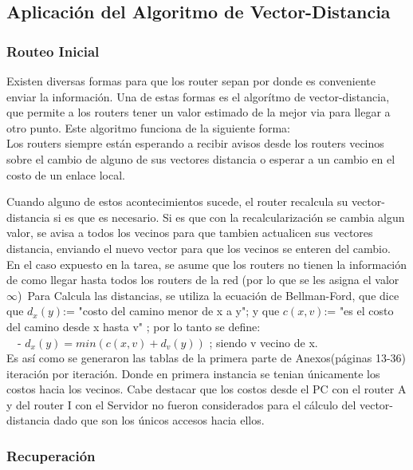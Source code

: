 \documentclass[12pt]{article}
\begin{document}
\subsection{Aplicación del Algoritmo de Vector-Distancia}
\subsubsection{Routeo Inicial}
Existen diversas formas para que los router sepan por donde es conveniente enviar la información. Una de estas formas es el algorítmo de vector-distancia, que permite a los routers tener un valor estimado de la mejor via para llegar a otro punto. Este algoritmo funciona de la siguiente forma:\\
	
	Los routers siempre están esperando a recibir avisos desde los routers vecinos sobre el cambio de alguno de sus vectores distancia o esperar a un cambio en el costo de un enlace local.\
	
	Cuando alguno de estos acontecimientos sucede, el router recalcula su vector-distancia si es que es necesario. Si es que con la recalcularización se cambia algun valor, se avisa a todos los vecinos para que tambien actualicen sus vectores distancia, enviando el nuevo vector para que los vecinos se enteren del cambio.\\
	
	En el caso expuesto en la tarea, se asume que los routers no tienen la información de como llegar hasta todos los routers de la red (por lo que se les asigna el valor $\infty$)\
	Para Calcula las distancias, se utiliza la ecuación de Bellman-Ford, que dice que $d_{x}(y)$:= "costo del camino menor de x a y"; y que $c(x,v)$:= "es el costo del camino desde x hasta v" ; por lo tanto se define:\\
\ \	- $d_{x}(y)=min( c(x,v) + d_{v}(y))$ ; siendo v vecino de x.\\

	Es así como se generaron las tablas de la primera parte de Anexos(páginas 13-36) iteración por iteración. Donde en primera instancia se tenian únicamente los costos hacia los vecinos. Cabe destacar que los costos desde el PC con el router A y del router I con el Servidor no fueron considerados para el cálculo del vector-distancia dado que son los únicos accesos hacia ellos.
	
\subsubsection{Recuperación}
\end{document}
